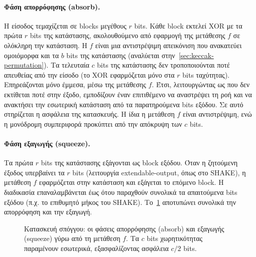 \paragraph{Φάση απορρόφησης (absorb).}
Η είσοδος τεμαχίζεται σε blocks μεγέθους $r$ bits.
Κάθε block εκτελεί XOR με τα πρώτα $r$ bits της κατάστασης, ακολουθούμενο από
εφαρμογή της μετάθεσης $f$ σε ολόκληρη την κατάσταση. Η $f$ είναι μια
αντιστρέψιμη απεικόνιση που ανακατεύει ομοιόμορφα και τα $b$ bits της
κατάστασης (αναλύεται στην~\cref{sec:keccak-permutation}).
Τα τελευταία $c$ bits της κατάστασης δεν τροποποιούνται ποτέ απευθείας από την είσοδο (το XOR
εφαρμόζεται μόνο στα $r$ bits ταχύτητας). Επηρεάζονται μόνο έμμεσα, μέσω της
μετάθεσης $f$. Έτσι, λειτουργώντας ως  που δεν εκτίθεται ποτέ στην
έξοδο, εμποδίζουν έναν επιτιθέμενο να αναστρέψει τη ροή και να ανακτήσει την
εσωτερική κατάσταση από τα παρατηρούμενα bits εξόδου. Σε αυτό στηρίζεται η
ασφάλεια της κατασκευής. Η ίδια η μετάθεση $f$ είναι αντιστρέψιμη, ενώ η μονόδρομη
συμπεριφορά προκύπτει από την απόκρυψη των $c$ bits.

\paragraph{Φάση εξαγωγής (squeeze).}
Τα πρώτα $r$ bits της κατάστασης εξάγονται ως block εξόδου.
Όταν η ζητούμενη έξοδος υπερβαίνει τα $r$ bits (λειτουργία extendable-output, όπως στο SHAKE), η
μετάθεση $f$ εφαρμόζεται στην κατάσταση και εξάγεται το επόμενο block.
Η διαδικασία επαναλαμβάνεται έως ότου παραχθούν συνολικά τα απαιτούμενα bits εξόδου (π.χ. το επιθυμητό μήκος του SHAKE).
Το~\cref{fig:keccak-sponge} αποτυπώνει συνολικά την απορρόφηση και την εξαγωγή.

\begin{figure}[htbp]
  \centering
  
  \caption[Sponge construction: absorb και squeeze]{Κατασκευή σπόγγου: οι φάσεις απορρόφησης (absorb) και εξαγωγής
  (squeeze) γύρω από τη μετάθεση $f$. Τα $c$ bits χωρητικότητας παραμένουν
  εσωτερικά, εξασφαλίζοντας ασφάλεια $c/2$ bits.}
  \label{fig:keccak-sponge}
\end{figure}

